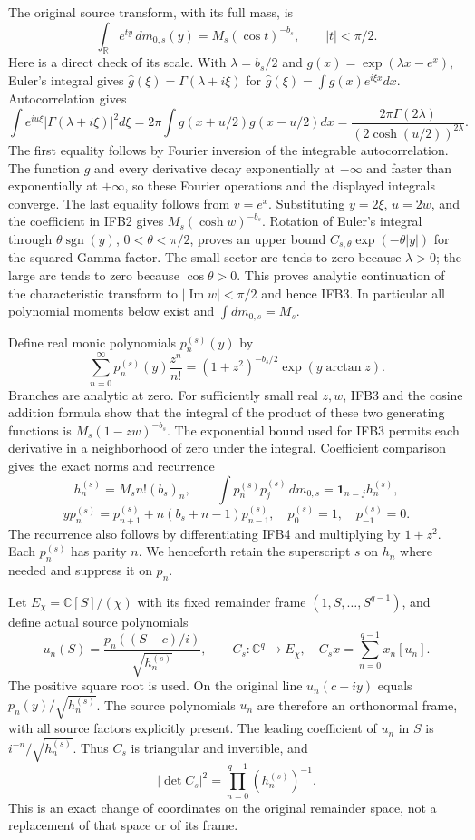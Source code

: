 \documentclass[11pt,a4paper]{article}
\begin{document}
The original source transform, with its full mass, is
\[
 \int_{\mathbb R}e^{ty}\,dm_{0,s}(y)
       =M_s(\cos t)^{-b_s},\qquad |t|<\pi/2.
 \tag{IFB3}
\]
Here is a direct check of its scale. With $\lambda=b_s/2$ and
$g(x)=\exp(\lambda x-e^x)$, Euler's integral gives
$\widehat g(\xi)=\Gamma(\lambda+i\xi)$ for
$\widehat g(\xi)=\int g(x)e^{i\xi x}dx$. Autocorrelation gives
\[
 \int e^{iu\xi}|\Gamma(\lambda+i\xi)|^2d\xi
 =2\pi\int g(x+u/2)g(x-u/2)dx
 =\frac{2\pi\Gamma(2\lambda)}{(2\cosh(u/2))^{2\lambda}}.
\]
The first equality follows by Fourier inversion of the integrable
autocorrelation. The function $g$ and every derivative decay
exponentially at $-\infty$ and faster than exponentially at $+\infty$,
so these Fourier operations and the displayed integrals converge.
The last equality follows from $v=e^x$. Substituting $y=2\xi$,
$u=2w$, and the coefficient in IFB2 gives
$M_s(\cosh w)^{-b_s}$. Rotation of Euler's integral through
$\theta\operatorname{sgn}(y)$, $0<\theta<\pi/2$, proves an
upper bound $C_{s,\theta}\exp(-\theta|y|)$ for the squared Gamma
factor. The small sector arc tends to zero because $\lambda>0$;
the large arc tends to zero because $\cos\theta>0$. This proves
analytic continuation of the characteristic transform to
$|\operatorname{Im}w|<\pi/2$ and hence IFB3. In particular all
polynomial moments below exist and $\int dm_{0,s}=M_s$.

Define real monic polynomials $p_n^{(s)}(y)$ by
\[
 \sum_{n=0}^\infty p_n^{(s)}(y)\frac{z^n}{n!}
 =(1+z^2)^{-b_s/2}\exp(y\arctan z).
 \tag{IFB4}
\]
Branches are analytic at zero. For sufficiently small real $z,w$,
IFB3 and the cosine addition formula show that the integral of the
product of these two generating functions is
$M_s(1-zw)^{-b_s}$. The exponential bound used for IFB3 permits
each derivative in a neighborhood of zero under the integral.
Coefficient comparison gives the exact norms and recurrence
\[
 h_n^{(s)}=M_s n!(b_s)_n,\qquad
 \int p_n^{(s)}p_j^{(s)}\,dm_{0,s}
       =\mathbf1_{n=j}h_n^{(s)},
\]
\[
 yp_n^{(s)}=p_{n+1}^{(s)}+n(b_s+n-1)p_{n-1}^{(s)},\quad
 p_0^{(s)}=1,\quad p_{-1}^{(s)}=0.
 \tag{IFB5}
\]
The recurrence also follows by differentiating IFB4 and multiplying
by $1+z^2$. Each $p_n^{(s)}$ has parity $n$. We henceforth retain
the superscript $s$ on $h_n$ where needed and suppress it on $p_n$.

Let $E_\chi=\mathbb C[S]/(\chi)$ with its fixed remainder frame
$(1,S,\ldots,S^{q-1})$, and define actual source polynomials
\[
 u_n(S)=\frac{p_n((S-c)/i)}{\sqrt{h_n^{(s)}}},\qquad
 C_s:\mathbb C^q\longrightarrow E_\chi,\quad
 C_s x=\sum_{n=0}^{q-1}x_n[u_n].
 \tag{IFB6}
\]
The positive square root is used. On the original line $u_n(c+iy)$
equals $p_n(y)/\sqrt{h_n^{(s)}}$. The source polynomials $u_n$ are
therefore an orthonormal frame, with all source factors explicitly
present. The leading coefficient of $u_n$ in $S$ is
$i^{-n}/\sqrt{h_n^{(s)}}$. Thus $C_s$ is triangular and invertible,
and
\[
 |\det C_s|^2=\prod_{n=0}^{q-1}(h_n^{(s)})^{-1}.
 \tag{IFB7}
\]
This is an exact change of coordinates on the original remainder
space, not a replacement of that space or of its frame.
\end{document}
